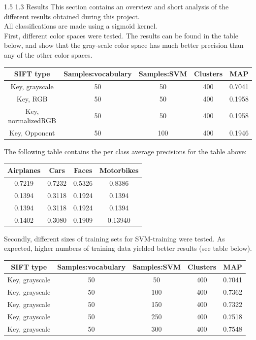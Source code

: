 \documentclass[12pt,a4paper]{amsart}
\makeatletter
\def\section{%
  \@startsection{section}{1}{\z@}%
  {1.5\linespacing\@plus\linespacing}%
  {1.3\linespacing}%
  {\bfseries\normalfont\scshape}
}
\makeatother
\begin{document}
\section{Results}
This section contains an overview and short analysis of the different results obtained during this project. \\
All classifications are made using a sigmoid kernel.\\
First, different color spaces were tested. The results can be found in the table below, and show that the gray-scale color space has much better precision than any of the other color spaces. \\
\begin{tabular}{|ccccc|}
\hline
SIFT type & Samples:vocabulary & Samples:SVM & Clusters & MAP\\
\toprule
Key, grayscale & 50 & 50 & 400 & 0.7041 \\
Key, RGB & 50 & 50 & 400 & 0.1958 \\
Key, normalizedRGB & 50 & 50 & 400 & 0.1958\\
Key, Opponent & 50 & 100 & 400 & 0.1946\\
\hline
\end{tabular}
The following table contains the per class average precisions for the table above:\\
\begin{tabular}{|cccc|}
Airplanes & Cars & Faces & Motorbikes\\
\toprule
0.7219&0.7232&0.5326&0.8386\\
0.1394 & 0.3118 & 0.1924 & 0.1394\\
0.1394 & 0.3118 & 0.1924 & 0.1394\\
0.1402 & 0.3080 & 0.1909 & 0.13940\\
\hline
\end{tabular}
\newline
Secondly, different sizes of training sets for SVM-training were tested. As expected, higher numbers of training data yielded better results (see table below).\\
\begin{tabular}{|ccccc|}
\hline
SIFT type & Samples:vocabulary & Samples:SVM & Clusters & MAP\\
\toprule
Key, grayscale & 50 & 50 & 400 & 0.7041 \\
Key, grayscale & 50 & 100 & 400 & 0.7362\\
Key, grayscale & 50 & 150 & 400 &  0.7322\\
Key, grayscale & 50 & 250 & 400 &0.7518\\
Key, grayscale & 50 & 300 & 400 & 0.7548\\
\hline
\end{tabular}
\end{document}
